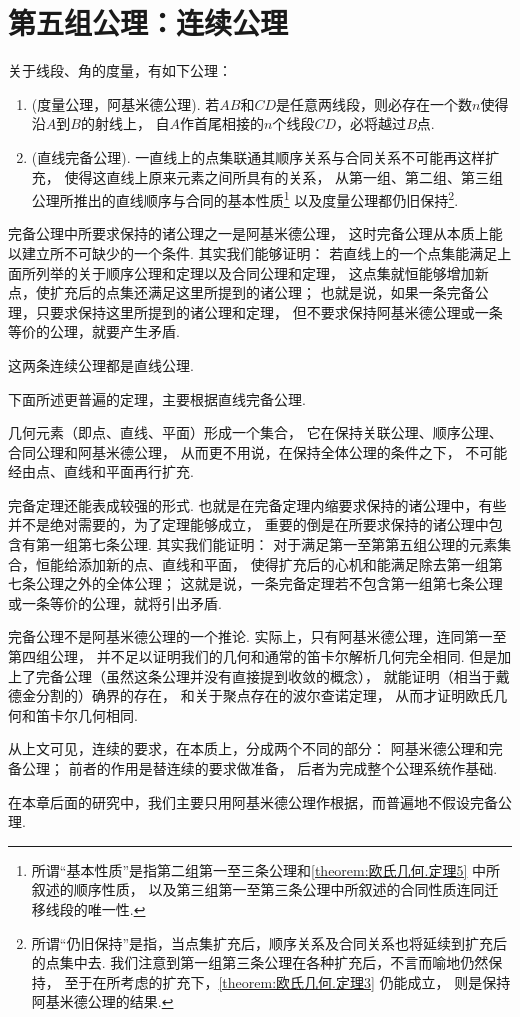 \section{第五组公理：连续公理}
\begin{axiom}[连续公理]
关于线段、角的度量，有如下公理：
\begin{enumerate}
	\item (度量公理，阿基米德公理).
	若\(AB\)和\(CD\)是任意两线段，则必存在一个数\(n\)使得沿\(A\)到\(B\)的射线上，
	自\(A\)作首尾相接的\(n\)个线段\(CD\)，必将越过\(B\)点.
	\item (直线完备公理).
	一直线上的点集联通其顺序关系与合同关系不可能再这样扩充，
	使得这直线上原来元素之间所具有的关系，
	从第一组、第二组、第三组公理所推出的直线顺序与合同的基本性质\footnote{%
	所谓“基本性质”是指第二组第一至三条公理和\cref{theorem:欧氏几何.定理5} 中所叙述的顺序性质，
	以及第三组第一至第三条公理中所叙述的合同性质连同迁移线段的唯一性.}
	以及度量公理都仍旧保持\footnote{%
	所谓“仍旧保持”是指，当点集扩充后，顺序关系及合同关系也将延续到扩充后的点集中去.
	我们注意到第一组第三条公理在各种扩充后，不言而喻地仍然保持，
	至于在所考虑的扩充下，\cref{theorem:欧氏几何.定理3} 仍能成立，
	则是保持阿基米德公理的结果.}.
\end{enumerate}
\end{axiom}

完备公理中所要求保持的诸公理之一是阿基米德公理，
这时完备公理从本质上能以建立所不可缺少的一个条件.
其实我们能够证明：
若直线上的一个点集能满足上面所列举的关于顺序公理和定理以及合同公理和定理，
这点集就恒能够增加新点，使扩充后的点集还满足这里所提到的诸公理；
也就是说，如果一条完备公理，只要求保持这里所提到的诸公理和定理，
但不要求保持阿基米德公理或一条等价的公理，就要产生矛盾.

这两条连续公理都是直线公理.

下面所述更普遍的定理，主要根据直线完备公理.
\begin{theorem}[完备定理]\label{theorem:欧氏几何.定理32}
几何元素（即点、直线、平面）形成一个集合，
它在保持关联公理、顺序公理、合同公理和阿基米德公理，
从而更不用说，在保持全体公理的条件之下，
不可能经由点、直线和平面再行扩充.
\end{theorem}

完备定理还能表成较强的形式.
也就是在完备定理内缩要求保持的诸公理中，有些并不是绝对需要的，为了定理能够成立，
重要的倒是在所要求保持的诸公理中包含有第一组第七条公理.
其实我们能证明：
对于满足第一至第第五组公理的元素集合，恒能给添加新的点、直线和平面，
使得扩充后的心机和能满足除去第一组第七条公理之外的全体公理；
这就是说，一条完备定理若不包含第一组第七条公理或一条等价的公理，就将引出矛盾.

完备公理不是阿基米德公理的一个推论.
实际上，只有阿基米德公理，连同第一至第四组公理，
并不足以证明我们的几何和通常的笛卡尔解析几何完全相同.
但是加上了完备公理（虽然这条公理并没有直接提到收敛的概念），
就能证明（相当于戴德金分割的）确界的存在，
和关于聚点存在的波尔查诺定理，
从而才证明欧氏几何和笛卡尔几何相同.

从上文可见，连续的要求，在本质上，分成两个不同的部分：
阿基米德公理和完备公理；
前者的作用是替连续的要求做准备，
后者为完成整个公理系统作基础.

在本章后面的研究中，我们主要只用阿基米德公理作根据，而普遍地不假设完备公理.
